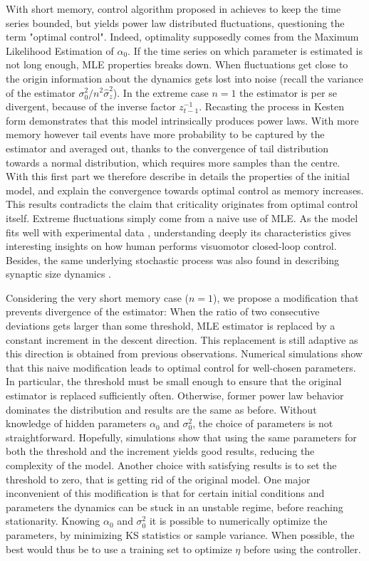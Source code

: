 \documentclass[FinalReport.tex]{subfiles}
\begin{document}
With short memory, control algorithm proposed in \cite{OptCont} achieves to keep the time series bounded, but yields power law distributed fluctuations, questioning the term "optimal control". Indeed, optimality supposedly comes from the Maximum Likelihood Estimation of $\alpha_0$. If the time series on which parameter is estimated is not long enough, MLE properties breaks down. When fluctuations get close to the origin information about the dynamics gets lost into noise (recall the variance of the estimator $\sigma_0^2/n^2 \hat{\sigma}_z^2$). In the extreme case $n=1$ the estimator is per se divergent, because of the inverse factor $z_{t-1}^{-1}$. 
Recasting the process in Kesten form demonstrates that this model intrinsically produces power laws.
With more memory however tail events have more probability to be captured by the estimator and averaged out, thanks to the convergence of tail distribution towards a normal distribution, which requires more samples than the centre. With this first part we therefore describe in details the properties of the initial model, and explain the convergence towards optimal control as memory increases. This results contradicts the claim that criticality originates from optimal control itself. Extreme fluctuations simply come from a naive use of MLE. As the model fits well with experimental data \cite{FrontNanoScience}, understanding deeply its characteristics gives interesting insights on how human performs visuomotor closed-loop control. Besides, the same underlying stochastic process was also found in describing synaptic size dynamics \cite{Holler2021}. 

Considering the very short memory case ($n=1$), we propose a modification that prevents divergence of the estimator: When the ratio of two consecutive deviations gets larger than some threshold, MLE estimator is replaced by a constant increment in the descent direction. This replacement is still adaptive as this direction is obtained from previous observations. Numerical simulations show that this naive modification leads to optimal control for well-chosen parameters. In particular, the threshold must be small enough to ensure that the original estimator is replaced sufficiently often. Otherwise, former power law behavior dominates the distribution and results are the same as before. Without knowledge of hidden parameters $\alpha_0$ and $\sigma_0^2$, the choice of parameters is not straightforward. Hopefully, simulations show that using the same parameters for both the threshold and the increment yields good results, reducing the complexity of the model. Another choice with satisfying results is to set the threshold to zero, that is getting rid of the original model. One major inconvenient of this modification is that for certain initial conditions and parameters the dynamics can be stuck in an unstable regime, before reaching stationarity. Knowing $\alpha_0$ and $\sigma_0^2$ it is possible to numerically optimize the parameters, by minimizing KS statistics or sample variance. When possible, the best would thus be to use a training set to optimize $\eta$ before using the controller. 
\end{document}
